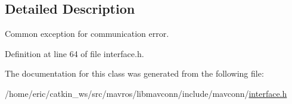 \subsection{Detailed Description}
Common exception for communication error. 

Definition at line 64 of file interface.\+h.



The documentation for this class was generated from the following file\+:\begin{DoxyCompactItemize}
\item 
/home/eric/catkin\+\_\+ws/src/mavros/libmavconn/include/mavconn/\mbox{\hyperlink{interface_8h}{interface.\+h}}\end{DoxyCompactItemize}
